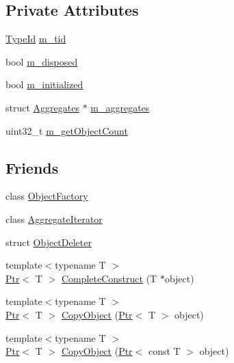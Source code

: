 \subsection*{Private Attributes}
\begin{DoxyCompactItemize}
\item 
\hyperlink{classns3_1_1TypeId}{Type\+Id} \hyperlink{classns3_1_1Object_ab9aaa1e40c7ea082f6f602c4694f2ab8}{m\+\_\+tid}
\item 
bool \hyperlink{classns3_1_1Object_a37e25c1c8e56ae9e7f9c15f1236e4081}{m\+\_\+disposed}
\item 
bool \hyperlink{classns3_1_1Object_afdecc4c2dde89891d0f285a535bb5a85}{m\+\_\+initialized}
\item 
struct \hyperlink{structns3_1_1Object_1_1Aggregates}{Aggregates} $\ast$ \hyperlink{classns3_1_1Object_a1f0aff511aa8bbed3f3c3dc9b1d41fe4}{m\+\_\+aggregates}
\item 
uint32\+\_\+t \hyperlink{classns3_1_1Object_af550c6702a9cec5f8bc16bff314d5f28}{m\+\_\+get\+Object\+Count}
\end{DoxyCompactItemize}
\subsection*{Friends}
\begin{DoxyCompactItemize}
\item 
class \hyperlink{classns3_1_1Object_a2810e70b8c8377aa8617138fc0f65e92}{Object\+Factory}
\item 
class \hyperlink{classns3_1_1Object_a361444a63ee78c28fb448ce71d005d47}{Aggregate\+Iterator}
\item 
struct \hyperlink{classns3_1_1Object_a0942fdb0db48d3939bba45a3a7a308c3}{Object\+Deleter}
\item 
{\footnotesize template$<$typename T $>$ }\\\hyperlink{classns3_1_1Ptr}{Ptr}$<$ T $>$ \hyperlink{classns3_1_1Object_afa4ee10b4170511f43d543a755fa18bd}{Complete\+Construct} (T $\ast$object)
\end{DoxyCompactItemize}
{\bf }\par
\begin{DoxyCompactItemize}
\item 
{\footnotesize template$<$typename T $>$ }\\\hyperlink{classns3_1_1Ptr}{Ptr}$<$ T $>$ \hyperlink{classns3_1_1Object_ae13320b2910618312ecdb81e62e0cff6}{Copy\+Object} (\hyperlink{classns3_1_1Ptr}{Ptr}$<$ T $>$ object)
\item 
{\footnotesize template$<$typename T $>$ }\\\hyperlink{classns3_1_1Ptr}{Ptr}$<$ T $>$ \hyperlink{classns3_1_1Object_aabfae98486f045021109d3b97edb8e92}{Copy\+Object} (\hyperlink{classns3_1_1Ptr}{Ptr}$<$ const T $>$ object)
\end{DoxyCompactItemize}

